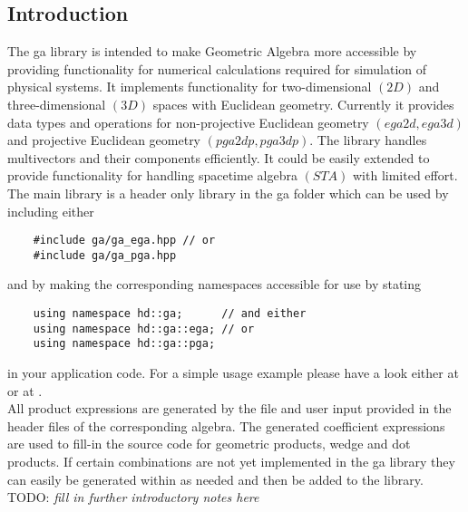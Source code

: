 \subsection{Introduction}

The ga library is intended to make Geometric Algebra more accessible by providing
functionality for numerical calculations required for simulation of physical systems. It
implements functionality for two-dimensional $(2D)$ and three-dimensional $(3D)$ spaces
with Euclidean geometry. Currently it provides data types and operations for
non-projective Euclidean geometry $(ega2d, ega3d)$ and projective Euclidean geometry
$(pga2dp, pga3dp)$. The library handles multivectors and their components efficiently. It
could be easily extended to provide functionality for handling spacetime algebra $(STA)$
with limited effort. \\

The main library is a header only library in the ga folder which can be used by including
either
\begin{verbatim}
    #include ga/ga_ega.hpp // or
    #include ga/ga_pga.hpp
\end{verbatim}
and by making the corresponding namespaces accessible for use by stating
\begin{verbatim}
    using namespace hd::ga;      // and either
    using namespace hd::ga::ega; // or
    using namespace hd::ga::pga;
\end{verbatim}
in your application code. For a simple usage example please have a look either at
 or at . \\

All product expressions are generated by the file  and
user input provided in the header files of the corresponding algebra. The generated
coefficient expressions are used to fill-in the source code for geometric products, wedge
and dot products. If certain combinations are not yet implemented in the ga library they
can easily be generated within  as needed and then be added to the
library. \\



TODO: \emph{fill in further introductory notes here}

\newpage
